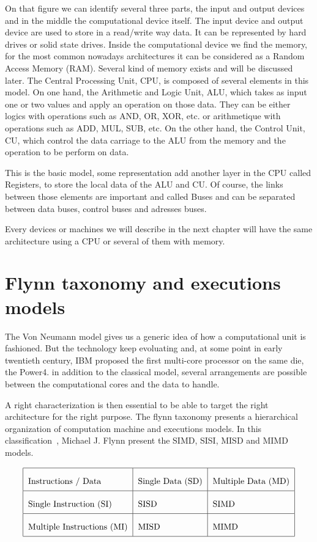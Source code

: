 On that figure we can identify several three parts, the input and output devices and in the middle the computational device itself. 
The input device and output device are used to store in a read/write way data. 
It can be represented by hard drives or solid state drives.
Inside the computational device we find the memory, for the most common nowadays architectures it can be considered as a Random Access Memory (RAM). 
Several kind of memory exists and will be discussed later. 
The Central Processing Unit, CPU, is composed of several elements in this model. 
On one hand, the Arithmetic and Logic Unit, ALU, which takes as input one or two values and apply an operation on those data. 
They can be either logics with operations such as AND, OR, XOR, etc. or arithmetique with operations such as ADD, MUL, SUB, etc.
On the other hand, the Control Unit, CU, which control the data carriage to the ALU from the memory and the operation to be perform on data.

This is the basic model, some representation add another layer in the CPU called Registers, to store the local data of the ALU and CU. 
Of course, the links between those elements are important and called Buses and can be separated between data buses, control buses and adresses buses. 

Every devices or machines we will describe in the next chapter will have the same architecture using a CPU or several of them with memory. 

\section{Flynn taxonomy and executions models}

The Von Neumann model gives us a generic idea of how a computational unit is fashioned. 
But the technology keep evoluating and, at some point in early twentieth century, IBM proposed the first multi-core processor on the same die, the Power4.
in addition to the classical model, several arrangements are possible between the computational cores and the data to handle. 

A right characterization is then essential to be able to target the right architecture for the right purpose. 
The flynn taxonomy presents a hierarchical organization of computation machine and executions models.
In this classification~\cite{flynn1972some}, Michael J. Flynn present the SIMD, SISI, MISD and MIMD models.

\begin{center}
\[\arraycolsep=1.4pt\def\arraystretch{2.2}
\begin{tabular}{| l | l | l |}
\hline
Instructions / Data	& Single Data (SD) 	& Multiple Data (MD) \\
\hline
Single Instruction (SI)		&  SISD			& SIMD \\
\hline
Multiple Instructions (MI) 	& 	MISD		& MIMD \\
\hline
\end{tabular}
\]
\end{center}

